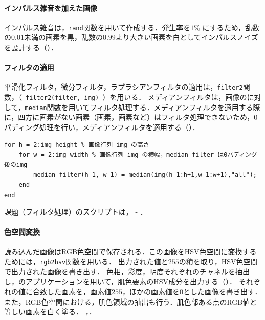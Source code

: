 \paragraph{インパルス雑音を加えた画像}
インパルス雑音は，\texttt{rand}関数を用いて作成する．発生率を\(1\%\) にするため，乱数の\(0.01\)未満の画素を黒，乱数の\(0.99\)より大きい画素を白としてインパルスノイズを設計する（）．
\paragraph{フィルタの適用}
平滑化フィルタ，微分フィルタ，ラプラシアンフィルタの適用は，\texttt{filter2}関数，（\ \verb|filter2(filter, img)|\ ）を用いる．
メディアンフィルタは，画像のに対して，\texttt{median}関数を用いてフィルタ処理する．メディアンフィルタを適用する際に，四方に画素がない画素（画素，画素など）はフィルタ処理できないため，0パディング処理を行い，メディアンフィルタを適用する（）．
\begin{lstlisting}[caption={メディアンフィルタの適用},label={src:メディアンフィルタの適用},frame={left}]
for h = 2:img_height % 画像行列 img の高さ
    for w = 2:img_width % 画像行列 img の横幅，median_filter は0パディング後のimg
        median_filter(h-1, w-1) = median(img(h-1:h+1,w-1:w+1),"all"); 
    end
end
\end{lstlisting}
課題（フィルタ処理）のスクリプトは， - ．
\paragraph{色空間変換}
読み込んだ画像はRGB色空間で保存される．この画像をHSV色空間に変換するためには，\texttt{rgb2hsv}関数を用いる．
出力された値と\(255\)の積を取り，HSV色空間で出力された画像を書き出す．
色相，彩度，明度それぞれのチャネルを抽出し，\matlab のアプリケーションを用いて，肌色要素のHSV成分を出力する（）．
それぞれの値に合致した画素を，画素値\(255\)，ほかの画素値を\(0\)とした画像を書き出す．また，RGB色空間における，肌色領域の抽出も行う．肌色部ある点のRGB値と等しい画素を白く塗る．
\scall{\kadaibe}，．
